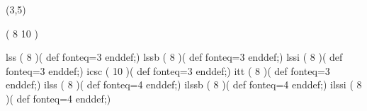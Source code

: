 %
%
%
%
%
%
%

\lhvercheck(3,5)

%
\MakeFileHeadstrue %
     \tablevalues                         (       8   10              )

\def\ifont{l}
     \makefont \ifont\fonttwoletters ss   (       8                   )(%
                                                        def fonteq=3 enddef;)
     \makefont \ifont\fonttwoletters ssb  (       8                   )(%
                                                        def fonteq=3 enddef;)
     \makefont \ifont\fonttwoletters ssi  (       8                   )(%
                                                        def fonteq=3 enddef;)
\def\ifont{i}
     \makefont \ifont\fonttwoletters csc  (           10              )(%
                                                        def fonteq=3 enddef;)
     \makefont \ifont\fonttwoletters tt   (       8                   )(%
                                                        def fonteq=3 enddef;)
\def\ifont{il}
     \makefont \ifont\fonttwoletters ss   (       8                   )(%
                                                        def fonteq=4 enddef;)
     \makefont \ifont\fonttwoletters ssb  (       8                   )(%
                                                        def fonteq=4 enddef;)
     \makefont \ifont\fonttwoletters ssi  (       8                   )(%
                                                        def fonteq=4 enddef;)

\endinput
